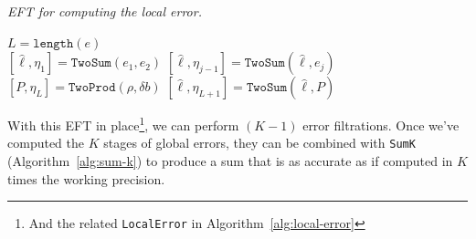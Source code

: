 \begin{breakablealgorithm}
  \caption{\textit{EFT for computing the local error.}}
  \label{alg:local-error-eft}

  \begin{algorithmic}
      \State \(L = \texttt{length}(e)\)
      \\
      \State \(\left[\widehat{\ell}, \eta_1\right] =
          \mathtt{TwoSum}(e_1, e_2)\)
        \State \(\left[\widehat{\ell}, \eta_{j - 1}\right] =
            \mathtt{TwoSum}\left(\widehat{\ell}, e_j\right)\)
      \EndFor
      \\
      \State \(\left[P, \eta_L\right] =
          \mathtt{TwoProd}\left(\rho, \delta b\right)\)
      \State \(\left[\widehat{\ell}, \eta_{L + 1}\right] =
          \mathtt{TwoSum}\left(\widehat{\ell}, P\right)\)
    \EndFunction
  \end{algorithmic}
\end{breakablealgorithm}

\noindent With this EFT in place\footnote{And the related
\texttt{LocalError} in Algorithm~\ref{alg:local-error}}, we can
perform \((K - 1)\) error filtrations. Once we've computed the \(K\) stages
of global errors, they can be combined with
\texttt{SumK} (Algorithm~\ref{alg:sum-k}) to produce a sum that is as
accurate as if computed in \(K\) times the working precision.

